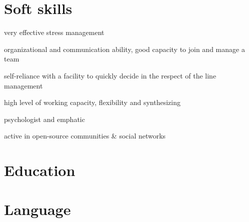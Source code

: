 \documentclass[11pt,a4paper]{moderncv}
\begin{document}
\section{Soft skills}

\begin{itemize} 
  {
     \item[\faCheckCircle] very effective stress management
     \item[\faCheckCircle] organizational and communication ability, good capacity to join and manage a team
     \item[\faCheckCircle] self-reliance with a facility to quickly decide in the respect of the line management
     \item[\faCheckCircle] high level of working capacity, flexibility and synthesizing
     \item[\faCheckCircle] psychologist and emphatic
     \item[\faCheckCircle] active in open-source communities \& social networks 
   }
\end{itemize}
 
\section{Education}
\vspace{-0.5 cm}  
\vspace{-0.5cm}
\vspace{-0.5cm}
 \vspace{-0.5cm}

\section{Language}
\begin{multicols}{2}
\end{multicols}
\end{document}

